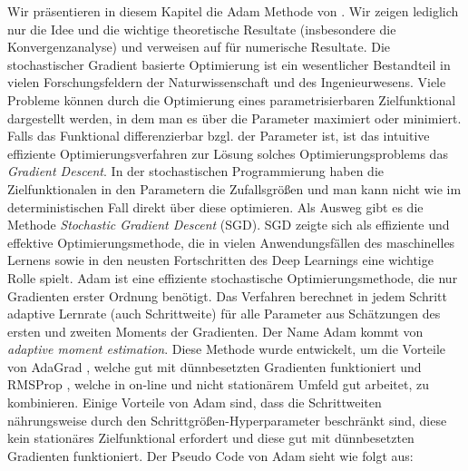 \documentclass[12pt,titlepage,headsepline]{article}
\begin{document}
      Wir präsentieren in diesem Kapitel die Adam Methode von \cite{kingma_adam_2017}. Wir zeigen lediglich nur die Idee und die wichtige theoretische Resultate (insbesondere die Konvergenzanalyse) und verweisen auf \cite{kingma_adam_2017} für numerische Resultate.
      \hfill\break
      Die stochastischer Gradient basierte Optimierung ist ein wesentlicher Bestandteil in vielen Forschungsfeldern der Naturwissenschaft und des Ingenieurwesens. Viele Probleme können durch die Optimierung eines parametrisierbaren Zielfunktional dargestellt werden, in dem man es über die Parameter maximiert oder minimiert. Falls das Funktional differenzierbar bzgl. der Parameter ist, ist das intuitive effiziente Optimierungsverfahren zur Lösung solches Optimierungsproblems das \textit{Gradient Descent}. In der stochastischen Programmierung haben die Zielfunktionalen in den Parametern die Zufallsgrößen und man kann nicht wie im deterministischen Fall direkt über diese optimieren. Als Ausweg gibt es die Methode \textit{Stochastic Gradient Descent} (SGD). SGD zeigte sich als effiziente und effektive Optimierungsmethode, die in vielen Anwendungsfällen des maschinelles Lernens sowie in den neusten Fortschritten des Deep Learnings \cite{deng2013recent} eine wichtige Rolle spielt.
      \hfill\break
      Adam ist eine effiziente stochastische Optimierungsmethode, die nur Gradienten erster Ordnung benötigt. Das Verfahren berechnet in jedem Schritt adaptive Lernrate (auch Schrittweite) für alle Parameter aus Schätzungen des ersten und zweiten Moments der Gradienten. Der Name Adam kommt von \textit{adaptive moment estimation}. Diese Methode wurde entwickelt, um die Vorteile von AdaGrad \cite{duchi_adaptive_2011}, welche gut mit dünnbesetzten Gradienten funktioniert und RMSProp \cite{tieleman2012lecture}, welche in on-line und nicht stationärem Umfeld gut arbeitet, zu kombinieren. Einige Vorteile von Adam sind, dass die Schrittweiten nährungsweise durch den Schrittgrößen-Hyperparameter beschränkt sind, diese kein stationäres Zielfunktional erfordert und diese gut mit dünnbesetzten Gradienten funktioniert.
      \hfill\break
      Der Pseudo Code von Adam sieht wie folgt aus:
\end{document}
